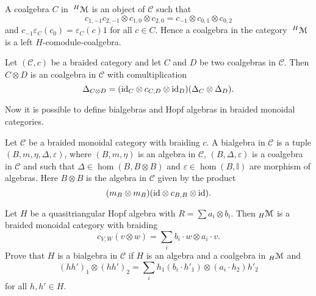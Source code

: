 
\begin{example}
A coalgebra $C$ in $\;^{H}\mathcal{M}$ is an object of $\mathcal{C}$
such that 
\[
c_{1,-1}c_{2,-1}\otimes c_{1,0}\otimes c_{2,0}=c_{-1}\otimes c_{0,1}\otimes c_{0,2}
\]
and $c_{-1}\varepsilon_{C}(c_{0})=\varepsilon_{C}(c)1$ for all $c\in C$. Hence
a coalgebra in the category $\;^{H}\mathcal{M}$ is a left $H$-comodule-coalgebra.
\end{example}

\begin{example}
Let $(\mathcal{C},c)$ be a braided category and let $C$ and $D$ be two
coalgebras in $\mathcal{C}$. Then $C\otimes D$ is an coalgebra in $\mathcal{C}$
with comultiplication 
\[
\Delta_{C\otimes D}=(\mathrm{id}_C\otimes c_{C,D}\otimes \mathrm{id}_D)(\Delta_C\otimes\Delta_D).
\]
\end{example}

Now it is possible to define bialgebras and Hopf algebras in braided monoidal categories. 

\begin{definition}
Let $\mathcal{C}$ be a braided monoidal category with braiding $c$.
A bialgebra in $\mathcal{C}$ is a tuple \textbf{$(B,m,\eta,\Delta,\varepsilon)$},
where $(B,m,\eta)$ is an algebra in $\mathcal{C}$, $(B,\Delta,\varepsilon)$
is a coalgebra in $\mathcal{C}$ and such that $\Delta\in\hom(B,B\otimes B)$
and $\varepsilon\in\hom(B,\mathbb{I})$ are morphism of algebras.
Here $B\otimes B$ is the algebra in $\mathcal{C}$ given by the product
\[
(m_{B}\otimes m_{B})(\mathrm{id}\otimes c_{B,B}\otimes\mathrm{id}).
\]
\end{definition}

\begin{exercise}
Let $H$ be a quasitriangular Hopf algebra with $R=\sum a_{i}\otimes b_{i}$.
Then ${}_{H}\mathcal{M}$ is a braided monoidal category with braiding
\[
c_{V,W}(v\otimes w)=\sum_{i}b_{i}\cdot w\otimes a_{i}\cdot v.
\]
Prove that $H$ is a bialgebra in $\mathcal{C}$ if $H$ is an algebra
and a coalgebra in ${}_{H}\mathcal{M}$ and 
\[
(hh')_{1}\otimes(hh')_{2}=\sum_{i}h_{1}(b_{i}\cdot h'_{1})\otimes(a_{i}\cdot h_{2})h'_{2}
\]
for all $h,h'\in H$.
\end{exercise}

